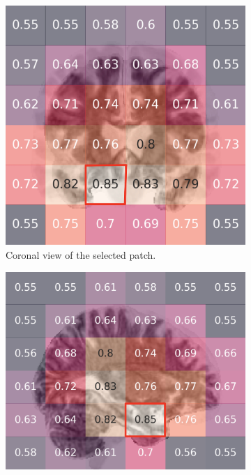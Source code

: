 \documentclass{article}
\begin{document}
\begin{figure}[b]
  \centering
  \begin{subfigure}{0.32\textwidth}
    \includegraphics[width=\textwidth]{figures/perf_coronal.png}
    \caption{Coronal view of the selected patch.}
  \end{subfigure}
  \hfill
  \begin{subfigure}{0.32\textwidth}
    \includegraphics[width=\textwidth]{figures/perf_saggital.png}

\end{subfigure}
\end{figure}
\end{document}
